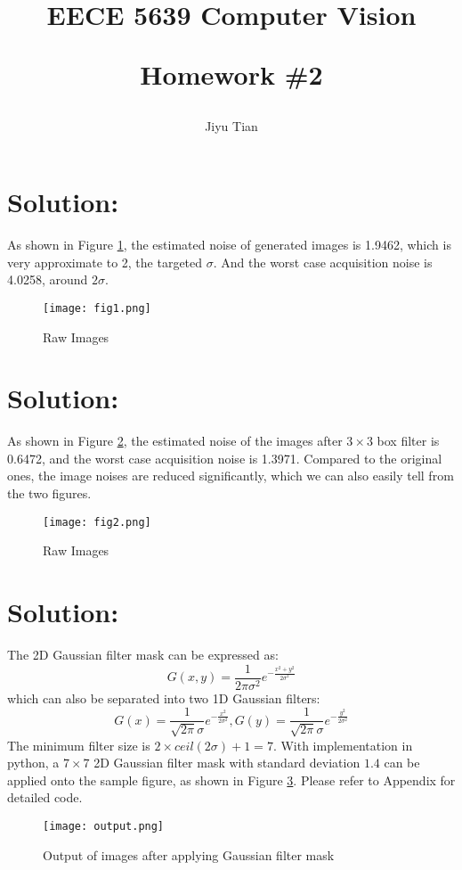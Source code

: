 \documentclass[12pt]{article}
\title{EECE 5639 Computer Vision\\ [2ex] \begin{large} Homework \#2 \end{large} }
\author{Jiyu Tian}
\date{}
\begin{document}
\maketitle
\section{Solution:}
As shown in Figure \ref{raw}, the estimated noise of generated images is 1.9462, which is very approximate to 2, the targeted $\sigma$. And the worst case acquisition noise is 4.0258, around $2\sigma$.
\begin{figure}[H]
\centering
\texttt{[image: fig1.png]}
\caption{Raw Images}
\label{raw}
\end{figure}
\section{Solution:}
As shown in Figure \ref{filtered}, the estimated noise of the images after $3\times3$ box filter is 0.6472, and the worst case acquisition noise is 1.3971. Compared to the original ones, the image noises are reduced significantly, which we can also easily tell from the two figures.
\begin{figure}[H]
\centering
\texttt{[image: fig2.png]}
\caption{Raw Images}
\label{filtered}
\end{figure}
\section{Solution:}
The 2D Gaussian filter mask can be expressed as:
\begin{equation*}
    G(x,y) = \frac{1}{2\pi\sigma^2}e^{-\frac{x^2+y^2}{2\sigma^2}}
\end{equation*}
which can also be separated into two 1D Gaussian filters:
\begin{equation*}
    G(x) = \frac{1}{\sqrt{2\pi}\sigma}e^{-\frac{x^2}{2\sigma^2}}, G(y) = \frac{1}{\sqrt{2\pi}\sigma}e^{-\frac{y^2}{2\sigma^2}}
\end{equation*}
The minimum filter size is $2\times ceil(2\sigma)+1=7$. With implementation in python, a $7\times 7$ 2D Gaussian filter mask with standard deviation $1.4$ can be applied onto the sample figure, as shown in Figure \ref{ouput}. Please refer to Appendix for detailed code.
\begin{figure}[H]
\centering
\texttt{[image: output.png]}
\caption{Output of images after applying Gaussian filter mask}
\label{ouput}
\end{figure}
\end{document}
